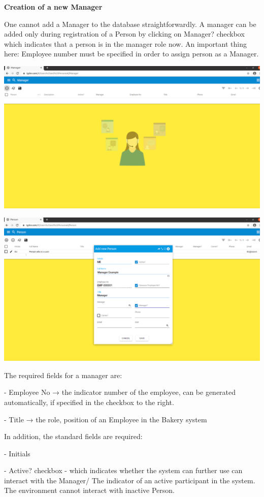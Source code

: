 \textbf{Creation of a new Manager}

One cannot add a Manager to the database straightforwardly. 
A manager can be added only during registration of a Person by clicking on Manager? checkbox which indicates that a person is in the manager role now.
An important thing here: Employee number must be specified in order to assign person as a Manager.

\includegraphics[width=\textwidth]{sections/01-chapter/images/manager1.png}

\includegraphics[width=\textwidth]{sections/01-chapter/images/manager2.png}


The required fields for a manager are:

- Employee No → the indicator number of the employee, can be generated automatically, if specified in the checkbox to the right.

- Title → the role, position of an Employee in the Bakery system

In addition, the standard fields are required:

- Initials

- Active? checkbox - which indicates whether the system can further use can interact with the Manager/ The indicator of an active participant in the system. The environment cannot interact with inactive Person.

